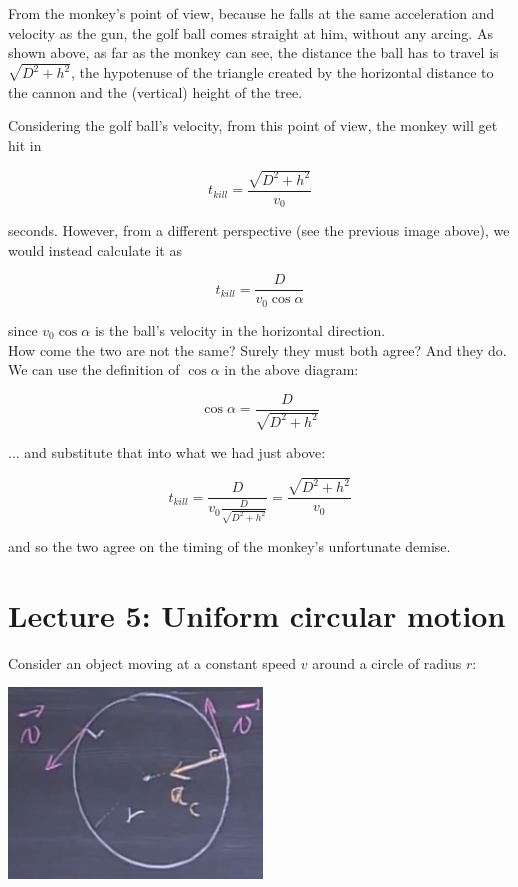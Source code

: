 \documentclass[8.01x]{subfiles}
\begin{document}
From the monkey's point of view, because he falls at the same acceleration and velocity as the gun, the golf ball comes straight at him, without any arcing. As shown above, as far as the monkey can see, the distance the ball has to travel is $\sqrt{D^2 + h^2}$, the hypotenuse of the triangle created by the horizontal distance to the cannon and the (vertical) height of the tree.

Considering the golf ball's velocity, from this point of view, the monkey will get hit in

\begin{equation}
t_{kill} = \frac{\sqrt{D^2 + h^2}}{v_0}
\end{equation}

seconds. However, from a different perspective (see the previous image above), we would instead calculate it as

\begin{equation}
t_{kill} = \frac{D}{v_0 \cos \alpha}
\end{equation}

since $v_0 \cos \alpha$ is the ball's velocity in the horizontal direction.\\
How come the two are not the same? Surely they must both agree? And they do. We can use the definition of $\cos \alpha$ in the above diagram:

\begin{equation}
\cos \alpha = \frac{D}{\sqrt{D^2 + h^2}}
\end{equation}

... and substitute that into what we had just above:

\begin{equation}
t_{kill} = \frac{D}{v_0 \frac{D}{\sqrt{D^2 + h^2}}} = \frac{\sqrt{D^2 + h^2}}{v_0} 
\end{equation}

and so the two agree on the timing of the monkey's unfortunate demise.

\newpage

\section{Lecture 5: Uniform circular motion}

Consider an object moving at a constant speed $v$ around a circle of radius $r$:

\begin{center}
\includegraphics[scale=0.6]{Graphics/lec5_centripetal_acceleration}
\end{center}
\end{document}
